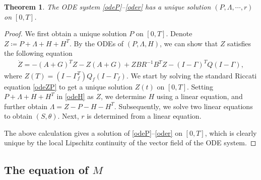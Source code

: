 \documentclass{amsart}
\newtheorem{theorem}{Theorem}[section]
\theoremstyle{definition}
\theoremstyle{remark}
\numberwithin{equation}{section}
\begin{document}
\begin{theorem}\label{theorem:lqv}
The ODE system \eqref{odeP}--\eqref{oder} has a unique solution
$(P,\Lambda, \cdots, r)$ on $[0,T]$.
\end{theorem}

\begin{proof}
We first obtain a unique solution $P$ on $[0,T]$.
Denote $Z\coloneqq P+\Lambda +H+H^T$. By the ODEs of $(P, \Lambda, H)$, we can show that $Z$ satisfies
the following equation
\begin{align}
\dot Z=-(A+G)^T Z-Z(A+G) +ZBR^{-1} B^TZ -(I-\Gamma)^TQ (I-\Gamma), \label{odeZP}
\end{align}
where $Z(T) =  (I-\Gamma_f^T) Q_f(I- \Gamma_f)$. We start by solving the standard Riccati equation \eqref{odeZP}  to get a unique solution $Z(t)$ on $[0,T]$.
 Setting $P+\Lambda+H+H^T$  in \eqref{odeH} as $Z$, we determine $H$ using a linear equation, and further obtain $\Lambda =Z-P-H-H^T $.
 Subsequently, we solve two linear equations  to obtain $(S, \theta)$. Next, $r$ is determined from a linear equation.

The above calculation gives a solution of \eqref{odeP}--\eqref{oder}   on $[0,T]$, which is clearly unique by the local Lipschitz continuity  of the vector field of the ODE system.
\end{proof}










\subsection{The equation of $M$}
\end{document}
